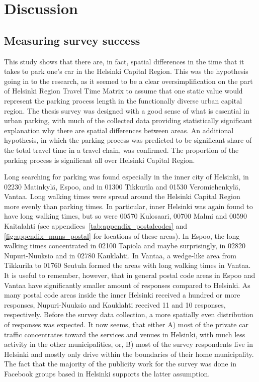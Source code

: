 \section{Discussion}
\label{sec:c5-discussion} %
\subsection{Measuring survey success}
\justify

This study shows that there are, in fact, spatial differences in the time that it takes to park one's car in the Helsinki Capital Region. This was the hypothesis going in to the research, as it seemed to be a clear oversimplification on the part of Helsinki Region Travel Time Matrix to assume that one static value would represent the parking process length in the functionally diverse urban capital region. The thesis survey was designed with a good sense of what is essential in urban parking, with much of the collected data providing statistically significant explanation why there are spatial differences between areas. An additional hypothesis, in which the parking process was predicted to be significant share of the total travel time in a travel chain, was confirmed. The proportion of the parking process is significant all over Helsinki Capital Region.

Long searching for parking was found especially in the inner city of Helsinki, in 02230 Matinkylä, Espoo, and in 01300 Tikkurila and  01530 Veromiehenkylä, Vantaa. Long walking times were spread around the Helsinki Capital Region more evenly than parking times. In particular, inner Helsinki was again found to have long walking times, but so were 00570 Kulosaari, 00700 Malmi and 00590 Kaitalahti (see appendices~\ref{tab:appendix_postalcodes} and \ref{fig:appendix_muns_postal} for locations of these areas). In Espoo, the long walking times concentrated in 02100 Tapiola and maybe surprisingly, in 02820 Nupuri-Nuuksio and in 02780 Kauklahti. In Vantaa, a wedge-like area from Tikkurila to 01760 Seutula formed the areas with long walking times in Vantaa. It is useful to remember, however, that in general postal code areas in Espoo and Vantaa have significantly smaller amount of responses compared to Helsinki. As many postal code areas inside the inner Helsinki received a hundred or more responses, Nupuri-Nuuksio and Kauklahti received 11 and 10 responses, respectively. Before the survey data collection, a more spatially even distribution of responses was expected. It now seems, that either A) most of the private car traffic concentrates toward the services and venues in Helsinki, with much less activity in the other municipalities, or, B) most of the survey respondents live in Helsinki and mostly only drive within the boundaries of their home municipality. The fact that the majority of the publicity work for the survey was done in Facebook groups based in Helsinki supports the latter assumption.

